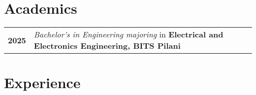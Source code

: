 \documentclass[a4paper,10pt]{extarticle} %
\begin{document}
\vspace{-0.1cm}
\section{\textcolor{primary}{Academics}}
\vspace{0.2cm}
\begin{tabular}{r|p{17.5cm}}	
\textbf{2025} & \textit{Bachelor's in Engineering majoring} in \textbf{Electrical and Electronics Engineering, BITS Pilani }\\

\end{tabular}

\vspace{0.2cm}
\section{\textcolor{primary}{Experience}}
 \vspace{0.2cm}
\end{document}
